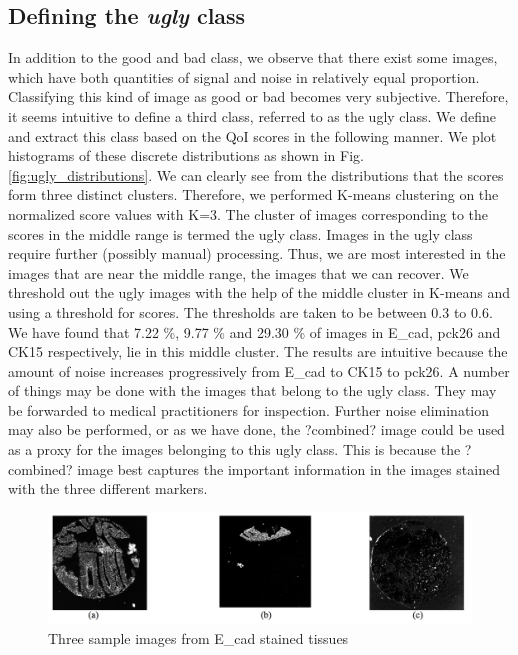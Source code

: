 \subsection{Defining the \textit{ugly} class}
In addition to the good and bad class, we observe that there exist some images, which have both quantities of signal and noise in relatively equal proportion. Classifying this kind of image as good or bad becomes very subjective. Therefore, it seems intuitive to define a third class, referred to as the ugly class. We define and extract this class based on the QoI scores in the following manner.
We plot histograms of these discrete distributions as shown in Fig. \ref{fig:ugly_distributions}. We can clearly see from the distributions that the scores form three distinct clusters. Therefore, we performed K-means clustering on the normalized score values with K=3. The cluster of images corresponding to the scores in the middle range is termed the ugly class. Images in the ugly class require further (possibly manual) processing. Thus, we are most interested in the images that are near the middle range, the images that we can recover. 
We threshold out the ugly images with the help of the middle cluster in K-means and using a threshold for scores. The thresholds are taken to be between 0.3 to 0.6. We have found that 7.22 \%, 9.77 \% and 29.30 \% of images in E\_cad, pck26 and CK15 respectively, lie in this middle cluster. The results are intuitive because the amount of noise increases progressively from E\_cad to CK15 to pck26. A number of things may be done with the images that belong to the ugly class. They may be forwarded to medical practitioners for inspection. Further noise elimination may also be performed, or as we have done, the ?combined? image could be used as a proxy for the images belonging to this ugly class. This is because the ?combined? image best captures the important information in the images stained with the three different markers.

 \begin{figure}[H]
\centering
\includegraphics[width=1.0\textwidth]{img/ugly_samples}
\caption{Three sample images from E\_cad stained tissues}
\label{fig:ugly_samples}
\end{figure}

